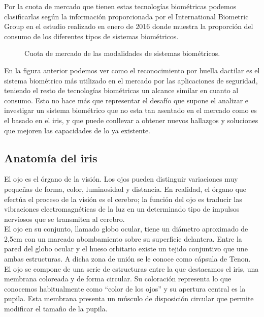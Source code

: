 Por la cuota de mercado que tienen estas tecnologías biométricas podemos clasificarlas según la información proporcionada por el International Biometric Group en el estudio realizado en enero de 2016 donde muestra la proporción del consumo de los diferentes tipos de sistemas biométricos.\\

\begin{figure}[htbp]
\centering
{}
\caption{Cuota de mercado de las modalidades de sistemas biométricos.} \label{fig:señales}
\end{figure}

En la figura anterior podemos ver como el reconocimiento por huella dactilar es el sistema biométrico más utilizado en el mercado por las aplicaciones de seguridad, teniendo el resto de tecnologías biométricas un alcance similar en cuanto al consumo. Esto no hace más que representar el desafío que supone el analizar e investigar un sistema biométrico que no esta tan asentado en el mercado como es el basado en el iris, y que puede conllevar a obtener nuevos hallazgos y soluciones que mejoren las capacidades de lo ya existente.


\subsection{Anatomía del iris}

El ojo es el órgano de la visión. Los ojos pueden distinguir variaciones muy pequeñas de forma, color, luminosidad y distancia. En realidad, el órgano que efectúa el proceso de la visión es el cerebro; la función del ojo es traducir las vibraciones electromagnéticas de la luz en un determinado tipo de impulsos nerviosos que se transmiten al cerebro. \\

El ojo en su conjunto, llamado globo ocular, tiene un diámetro aproximado de 2,5cm con un marcado abombamiento sobre su superficie delantera. Entre la pared del globo ocular y el hueso orbitario existe un tejido conjuntivo que une ambas estructuras. A dicha zona de unión se le conoce como cápsula de Tenon. \\

El ojo se compone de una serie de estructuras entre la que destacamos el iris, una membrana coloreada y de forma circular. Su coloración representa lo que conocemos habitualmente como “color de los ojos” y su apertura central es la pupila. Esta membrana presenta un músculo de disposición circular que permite modificar el tamaño de la pupila.\\

